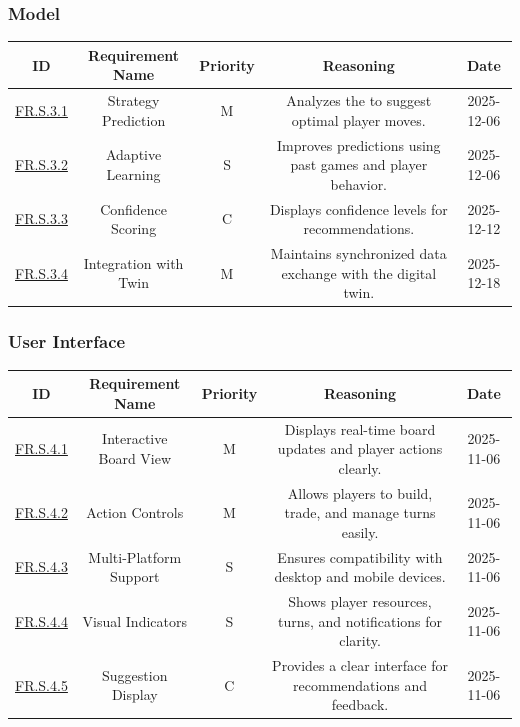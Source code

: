 \documentclass{article}
\begin{document}
\vspace{1em}

\subsubsection*{\AI{} Model}

\begin{tabular}{|c|c|c|c|c|}
\hline
\textbf{ID} & \textbf{Requirement Name} & \textbf{Priority} &
\textbf{Reasoning} & \textbf{Date} \\
\hline
\hyperref[FR.S.3.1]{FR.S.3.1} & Strategy Prediction & M &
\parbox[t]{4cm}{Analyzes the \GameState{} to suggest optimal player
moves.} &
2025-12-06 \\
\hline
\hyperref[FR.S.3.2]{FR.S.3.2} & Adaptive Learning & S &
\parbox[t]{4cm}{Improves predictions using past games and player
behavior.} &
2025-12-06 \\
\hline
\hyperref[FR.S.3.3]{FR.S.3.3} & Confidence Scoring & C &
\parbox[t]{4cm}{Displays confidence levels for \AI{} recommendations.} &
2025-12-12 \\
\hline
\hyperref[FR.S.3.4]{FR.S.3.4} & Integration with Twin & M &
\parbox[t]{4cm}{Maintains synchronized data exchange with the digital
twin.} &
2025-12-18 \\
\hline

\end{tabular}

\vspace{1em}

\subsubsection*{User Interface}

\begin{tabular}{|c|c|c|c|c|}
\hline
\textbf{ID} & \textbf{Requirement Name} & \textbf{Priority} &
\textbf{Reasoning} & \textbf{Date} \\
\hline
\hyperref[FR.S.4.1]{FR.S.4.1} & Interactive Board View & M &
\parbox[t]{4cm}{Displays real-time board updates and player actions
clearly.} &
2025-11-06 \\
\hline
\hyperref[FR.S.4.2]{FR.S.4.2} & Action Controls & M &
\parbox[t]{4cm}{Allows players to build, trade, and manage turns
easily.} &
2025-11-06 \\
\hline
\hyperref[FR.S.4.3]{FR.S.4.3} & Multi-Platform Support & S &
\parbox[t]{4cm}{Ensures compatibility with desktop and mobile
devices.} &
2025-11-06 \\
\hline
\hyperref[FR.S.4.4]{FR.S.4.4} & Visual Indicators & S &
\parbox[t]{4cm}{Shows player resources, turns, and notifications for
clarity.} &
2025-11-06 \\
\hline
\hyperref[FR.S.4.5]{FR.S.4.5} & \AI{} Suggestion Display & C &
\parbox[t]{4cm}{Provides a clear interface for \AI{} recommendations
and feedback.} &
2025-11-06 \\
\hline
\end{tabular}
\end{document}
